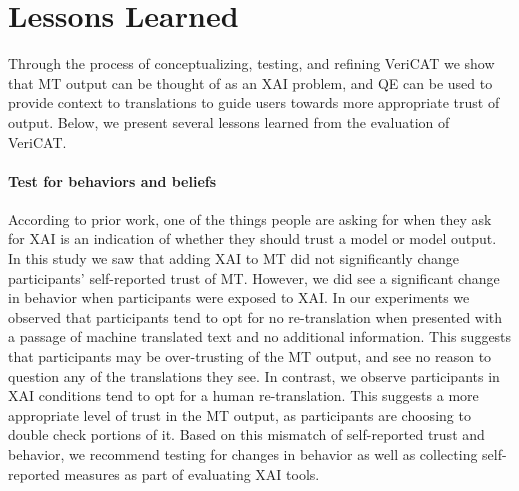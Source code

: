 \section{Lessons Learned}

Through the process of conceptualizing, testing, and refining VeriCAT we show that MT output can be thought of as an XAI problem, and QE can be used to provide context to translations to guide users towards more appropriate trust of output. Below, we present several lessons learned from the evaluation of VeriCAT.     



\paragraph{\textbf{Test for behaviors and beliefs}} According to prior work, one of the things people are asking for when they ask for XAI is an indication of whether they should trust a model or model output\cite{brennen2020What}. In this study we saw that adding XAI to MT did not significantly change participants' self-reported trust of MT. However, we did see a significant change in behavior when participants were exposed to XAI. In our experiments we observed that participants tend to opt for no re-translation when presented with a passage of machine translated text and no additional information. This suggests that participants may be over-trusting of the MT output, and see no reason to question any of the translations they see. In contrast, we observe participants in XAI conditions tend to opt for a human re-translation. This suggests a more appropriate level of trust in the MT output, as participants are choosing to double check portions of it. Based on this mismatch of self-reported trust and behavior, we recommend testing for changes in behavior as well as collecting self-reported measures as part of evaluating XAI tools.    

